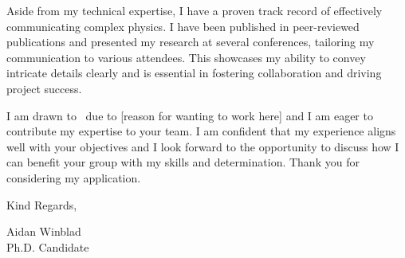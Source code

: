 \documentclass[12pt]{letter}
\newcommand{\myname}{Aidan Winblad} %
\newcommand{\mytitle}{Applicant} %
\newcommand{\closer}{Kind Regards} %
\newcommand{\company}{} %
\begin{document}
Aside from my technical expertise, I have a proven track record of effectively communicating complex physics.
I have been published in peer-reviewed publications and presented my research at several conferences, tailoring my communication to various attendees.
This showcases my ability to convey intricate details clearly and is essential in fostering collaboration and driving project success.

I am drawn to \company\ due to [reason for wanting to work here] and I am eager to contribute my expertise to your team.
I am confident that my experience aligns well with your objectives and I look forward to the opportunity to discuss how I can benefit your group with my skills and determination. Thank you for considering my application.

\vspace{0.1in}
\vfill

\begin{flushleft}
\closer,

\myname\\
Ph.D. Candidate
\end{flushleft}
\end{document}
